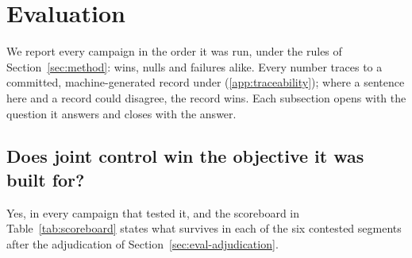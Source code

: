 \section{Evaluation}
\label{sec:eval}

We report every campaign in the order it was run, under the rules of
Section~\ref{sec:method}: wins, nulls and failures alike. Every number
traces to a committed, machine-generated record under
 (\ref{app:traceability}); where a
sentence here and a record could disagree, the record wins. Each
subsection opens with the question it answers and closes with the answer.

\subsection{Does joint control win the objective it was built for?}
\label{sec:eval-scoreboard}

Yes, in every campaign that tested it, and the scoreboard in
Table~\ref{tab:scoreboard} states what survives in each of the six
contested segments after the adjudication of
Section~\ref{sec:eval-adjudication}.

